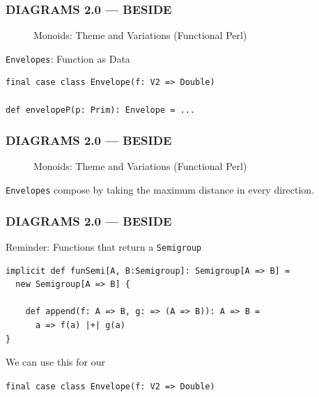 \documentclass{beamer}
\begin{document}
\begin{frame}[fragile] \frametitle{DIAGRAMS 2.0 --- BESIDE}
  \begin{figure}
      \centering
      \caption{Monoids: Theme and Variations (Functional Perl)}
  \end{figure}

  \vspace{-0.5cm}
  \pause

  \begin{block}{\texttt{Envelopes}: Function as Data}
  \begin{lstlisting}
final case class Envelope(f: V2 => Double)

def envelopeP(p: Prim): Envelope = ...
  \end{lstlisting}
  \end{block}
\end{frame}

\begin{frame} \frametitle{DIAGRAMS 2.0 --- BESIDE}
  \begin{figure}
      \centering
      \caption{Monoids: Theme and Variations (Functional Perl)}
  \end{figure}

  \texttt{Envelopes} compose by taking the maximum distance in every direction.
\end{frame}


\begin{frame}[fragile] \frametitle{DIAGRAMS 2.0 --- BESIDE}
  \begin{block}{Reminder: Functions that return a \texttt{Semigroup}}
  \begin{lstlisting}
implicit def funSemi[A, B:Semigroup]: Semigroup[A => B] =
  new Semigroup[A => B] {

    def append(f: A => B, g: => (A => B)): A => B =
      a => f(a) |+| g(a)
}
  \end{lstlisting}
  \end{block}

  We can use this for our

  \texttt{final case class Envelope(f: V2 => Double)}
\end{frame}
\end{document}
